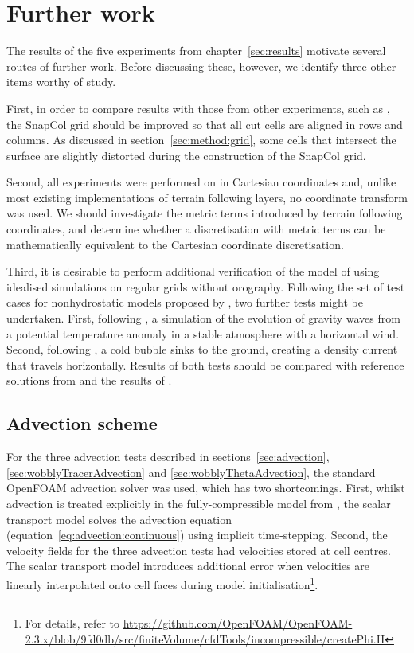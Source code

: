 \chapter{Further work}
\label{sec:further-work}

The results of the five experiments from chapter~\ref{sec:results} motivate several routes of further work.  Before discussing these, however, we identify three other items worthy of study.

First, in order to compare results with those from other experiments, such as \textcite{good2013}, the SnapCol grid should be improved so that all cut cells are aligned in rows and columns.  As discussed in section~\ref{sec:method:grid}, some cells that intersect the surface are slightly distorted during the construction of the SnapCol grid.

Second, all experiments were performed on in Cartesian coordinates and, unlike most existing implementations of terrain following layers, no coordinate transform was used.  We should investigate the metric terms introduced by terrain following coordinates, and determine whether a discretisation with metric terms can be mathematically equivalent to the Cartesian coordinate discretisation.

Third, it is desirable to perform additional verification of the model of \textcite{weller-shahrokhi2014} using idealised simulations on regular grids without orography.  Following the set of test cases for nonhydrostatic models proposed by \textcite{skamarock2004}, two further tests might be undertaken.  First, following \textcite{skamarock-klemp1994}, a simulation of the evolution of gravity waves from a potential temperature anomaly in a stable atmosphere with a horizontal wind.  Second, following \textcite{straka1993}, a cold bubble sinks to the ground, creating a density current that travels horizontally.  Results of both tests should be compared with reference solutions from \textcite{skamarock-klemp1994} and the results of \textcite{jebens2011}.

\section{Advection scheme}
\label{sec:further-work:advection}

For the three advection tests described in sections~\ref{sec:advection}, \ref{sec:wobblyTracerAdvection} and \ref{sec:wobblyThetaAdvection}, the standard OpenFOAM advection solver was used, which has two shortcomings.  First, whilst advection is treated explicitly in the fully-compressible model from \textcite{weller-shahrokhi2014}, the scalar transport model solves the advection equation (equation~\ref{eq:advection:continuous}) using implicit time-stepping.  Second, the velocity fields for the three advection tests had velocities stored at cell centres.  The scalar transport model introduces additional error when velocities are linearly interpolated onto cell faces during model initialisation\footnote{For details, refer to \url{https://github.com/OpenFOAM/OpenFOAM-2.3.x/blob/9fd0db/src/finiteVolume/cfdTools/incompressible/createPhi.H}}.

